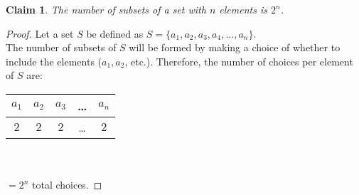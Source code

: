 \documentclass{article}
\newtheorem{claim}{Claim}
\begin{document}
 
\begin{claim}
    The number of subsets of a set with $n$ elements
    is $2^n$.
\end{claim}

\begin{proof}
    Let a set $S$ be defined as
    $ S = \{a_1,a_2,a_3,a_4,\dots,a_n\}. $\\

    The number of subsets of $S$ will be formed by 
    making a choice of whether to include the elements
    ($a_1, a_2$, etc.). Therefore, the number of choices
    per element of $S$ are:\\

    \begin{tabular}{|c|c|c|c|c|}
        \hline
        $a_1$ & $a_2$ & $a_3$ & \dots & $a_n$ \\
        \hline
        $2$ & $2$ & $2$ & \dots & $2$\\
        \hline
    \end{tabular}\\\\

    $ = 2^n $ total choices.
\end{proof}
\end{document}
